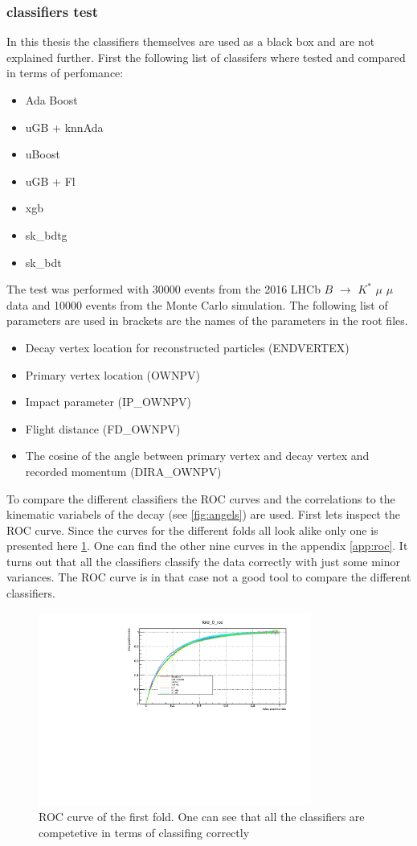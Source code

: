\documentclass[english]{uzhpub}
\begin{document}
\subsubsection{classifiers test}
In this thesis the classifiers themselves are used as a black box and are not explained further.
First the following list of classifers where tested and compared in terms of perfomance:
\begin{itemize}
 \item Ada Boost
 \item uGB + knnAda
 \item uBoost
 \item uGB + Fl
 \item xgb
 \item sk\_bdtg
 \item sk\_bdt
\end{itemize}
The test was performed with 30000 events from the 2016 LHCb $B$ $\rightarrow$ $K^{*}$ $\mu$ $\mu$ data and 10000 events from the Monte Carlo simulation. The following list of parameters are used in brackets are the names of the parameters in the root files.
\begin{itemize}
 \item Decay vertex location for reconstructed particles (ENDVERTEX)
 \item Primary vertex location (OWNPV)
 \item Impact parameter (IP\_OWNPV)
 \item Flight distance (FD\_OWNPV)
 \item The cosine of the angle between primary vertex and decay vertex and recorded momentum (DIRA\_OWNPV)
\end{itemize}
To compare the different classifiers the ROC curves and the correlations to the kinematic variabels of the decay (see \ref{fig:angels}) are used. First lets inspect the ROC curve. Since the curves for the different folds all look alike only one is presented here \ref{fig:roc}. One can find the other nine curves in the appendix \ref{app:roc}.
It turns out that all the classifiers classify the data correctly with just some minor variances. The ROC curve is in that case not a good tool to compare the different classifiers.
\begin{figure}[H]
 \centering
 \includegraphics[width=0.8\textwidth]{roc/fold_0_roc.pdf}
 \caption{ROC curve of the first fold. One can see that all the classifiers are competetive in terms of classifing correctly}
 \label{fig:roc}
\end{figure}
\end{document}
